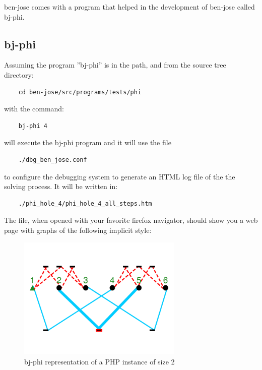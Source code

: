 \documentclass{easychair}
\begin{document}
ben-jose comes with a program that helped in the development of ben-jose called bj-phi.

\subsection{bj-phi}

Assuming the program ''bj-phi'' is in the path, and from the source tree directory:

\begin{verbatim}
	cd ben-jose/src/programs/tests/phi
\end{verbatim}

with the command:

\begin{verbatim}
	bj-phi 4
\end{verbatim}

will execute the bj-phi program and it will use the file 

\begin{verbatim}
	./dbg_ben_jose.conf
\end{verbatim}

to configure the debugging system to generate an HTML log file of the the solving process. It will be written in:

\begin{verbatim}
	./phi_hole_4/phi_hole_4_all_steps.htm
\end{verbatim}

The file, when opened with your favorite firefox navigator, should show you a web page with graphs of the following implicit style:


\begin{figure}[H]
	\begin{centering}
		\includegraphics[width=0.7\textwidth]{h2_base.png}
	\end{centering}
	\caption{bj-phi representation of a PHP instance of size 2}
	\label{fig:h2-graph}
\end{figure}
\end{document}
